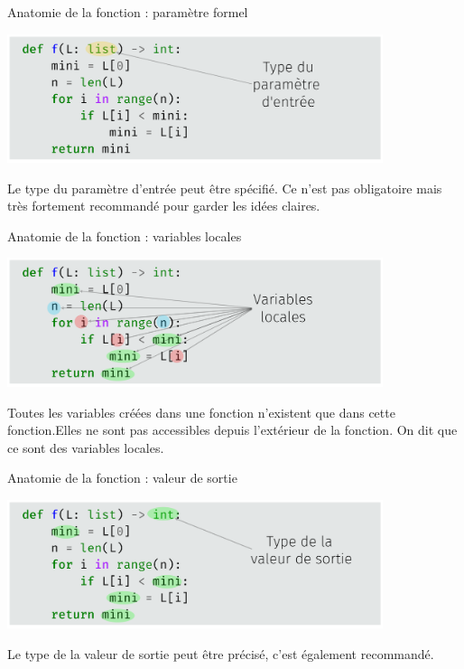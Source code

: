\documentclass[10pt]{beamer}
\begin{document}
    \begin{frame}{Anatomie de la fonction : paramètre formel}
    \begin{center}
        \includegraphics[width=11cm]{img/anat4}
    \end{center}\pause
    Le type du paramètre d'entrée peut être spécifié. Ce n'est pas obligatoire mais très fortement recommandé pour \og garder les idées claires\fg{}.
    \end{frame}
    \begin{frame}{Anatomie de la fonction : variables locales}
    \begin{center}
        \includegraphics[width=11cm]{img/anat2}
    \end{center}\pause
    Toutes les variables \alert{créées} dans une fonction n'existent \alert{que dans cette fonction}.\pause Elles ne sont pas accessibles depuis l'extérieur de la fonction. On dit que ce sont des \alert{variables locales}.
    \end{frame}
    \begin{frame}{Anatomie de la fonction : valeur de sortie}
    \begin{center}
        \includegraphics[width=11cm]{img/anat3}
    \end{center}\pause
    Le type de la valeur de sortie peut être précisé, c'est également recommandé.
\end{frame}
\end{document}

